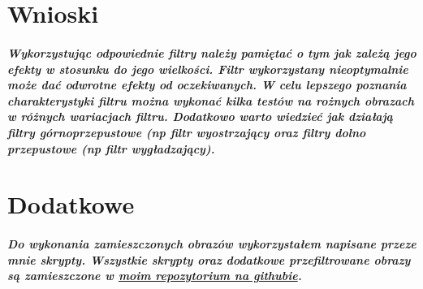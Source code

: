 \documentclass[a4paper,12pt,openany]{report}
\begin{document}
\chapter{Wnioski}

\paragraph{\indent Wykorzystując odpowiednie filtry należy pamiętać o tym jak zależą jego efekty w stosunku do jego wielkości. Filtr wykorzystany nieoptymalnie może dać odwrotne efekty od oczekiwanych. W celu lepszego poznania charakterystyki filtru można wykonać kilka testów na rożnych obrazach w różnych wariacjach filtru. Dodatkowo warto wiedzieć jak działają filtry górnoprzepustowe (np filtr wyostrzający oraz filtry dolno przepustowe (np filtr wygładzający).}


\chapter{Dodatkowe}
\paragraph{Do wykonania zamieszczonych obrazów wykorzystałem napisane przeze mnie skrypty. Wszystkie skrypty oraz dodatkowe przefiltrowane obrazy są zamieszczone w \href{https://github.com/FilipM13/CPS}{moim repozytorium na githubie}.}
\end{document}
